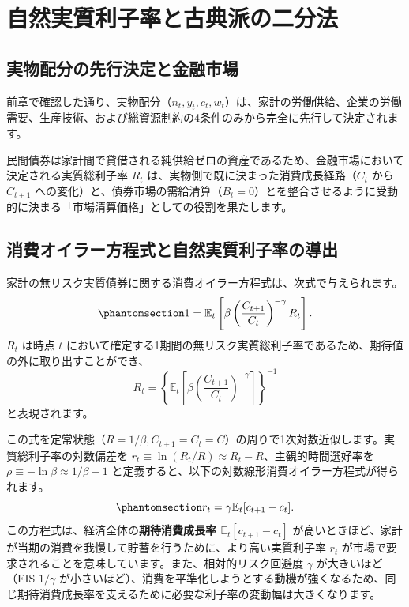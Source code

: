\documentclass[
  japanese,
  lualatex,
  ja=standard,
  12pt,
  a4paper]{ltjsarticle}
\begin{document}
\section{自然実質利子率と古典派の二分法}\label{ux81eaux7136ux5b9fux8ceaux5229ux5b50ux7387ux3068ux53e4ux5178ux6d3eux306eux4e8cux5206ux6cd5}

\subsection{実物配分の先行決定と金融市場}\label{ux5b9fux7269ux914dux5206ux306eux5148ux884cux6c7aux5b9aux3068ux91d1ux878dux5e02ux5834}

前章で確認した通り、実物配分（\(n_t, y_t, c_t, w_t\)）は、家計の労働供給、企業の労働需要、生産技術、および総資源制約の4条件のみから完全に先行して決定されます。

民間債券は家計間で貸借される純供給ゼロの資産であるため、金融市場において決定される実質総利子率
\(R_t\) は、実物側で既に決まった消費成長経路（\(C_t\) から \(C_{t+1}\)
への変化）と、債券市場の需給清算（\(B_t = 0\)）とを整合させるように受動的に決まる「市場清算価格」としての役割を果たします。

\subsection{消費オイラー方程式と自然実質利子率の導出}\label{ux6d88ux8cbbux30aaux30a4ux30e9ux30fcux65b9ux7a0bux5f0fux3068ux81eaux7136ux5b9fux8ceaux5229ux5b50ux7387ux306eux5c0eux51fa}

家計の無リスク実質債券に関する消費オイラー方程式は、次式で与えられます。
\begin{equation}\protect\phantomsection\label{eq-real-bond-euler}{
1 = \mathbb{E}_t \left[ \beta \left( \frac{C_{t+1}}{C_t} \right)^{-\gamma} R_t \right].
}\end{equation} \(R_t\) は時点 \(t\)
において確定する1期間の無リスク実質総利子率であるため、期待値の外に取り出すことができ、
\[
R_t = \left\{ \mathbb{E}_t \left[ \beta \left( \frac{C_{t+1}}{C_t} \right)^{-\gamma} \right] \right\}^{-1}
\] と表現されます。

この式を定常状態（\(R = 1/\beta, C_{t+1}=C_t=C\)）の周りで1次対数近似します。実質総利子率の対数偏差を
\(r_t \equiv \ln(R_t / R) \approx R_t - R\)、主観的時間選好率を
\(\rho \equiv -\ln\beta \approx 1/\beta - 1\)
と定義すると、以下の対数線形消費オイラー方程式が得られます。
\begin{equation}\protect\phantomsection\label{eq-natural-rate-euler}{
r_t = \gamma \mathbb{E}_t [c_{t+1} - c_t].
}\end{equation} この方程式は、経済全体の\textbf{期待消費成長率
\(\mathbb{E}_t[c_{t+1} - c_t]\)}
が高いときほど、家計が当期の消費を我慢して貯蓄を行うために、より高い実質利子率
\(r_t\) が市場で要求されることを意味しています。また、相対的リスク回避度
\(\gamma\) が大きいほど（EIS \(1/\gamma\)
が小さいほど）、消費を平準化しようとする動機が強くなるため、同じ期待消費成長率を支えるために必要な利子率の変動幅は大きくなります。
\end{document}

